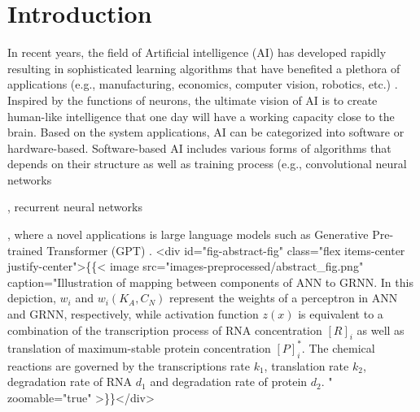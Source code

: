 \documentclass[twocolumn]{biophys-new}
\begin{document}
\section{Introduction}
In recent years, the field of Artificial intelligence (AI) has developed rapidly resulting in sophisticated learning algorithms that have benefited a plethora of applications (e.g., manufacturing, economics, computer vision, robotics, etc.) \cite{chowdhury2012advantages}.
Inspired by the functions of neurons, the ultimate vision of AI is to create human-like intelligence that one day will have a working capacity close to the brain. 
Based on the system applications, AI can be categorized into software or hardware-based. Software-based AI includes various forms of algorithms that depends on their structure as well as training process (e.g., convolutional neural networks {\cite{li2021survey}, recurrent neural networks {\cite{medsker2001recurrent}, where a novel applications is large language models such as Generative Pre-trained Transformer (GPT) \cite{kasneci2023chatgpt}. 
<div id="fig-abstract-fig" class="flex items-center justify-center">\{\{< image src="images-preprocessed/abstract_fig.png" caption="Illustration of mapping between components of ANN to GRNN. In this depiction, $w_i$ and $w_i(K_A, C_N)$ represent the weights of a perceptron in ANN and GRNN, respectively, while activation function $z(x)$ is equivalent to a combination of the transcription process of RNA concentration $[R]_i$ as well as translation of maximum-stable protein concentration $[P]_i^*$. The chemical reactions are governed by the transcriptions rate $k_1$, translation rate $k_2$, degradation rate of RNA $d_1$ and degradation rate of protein $d_2$. \vspace{1em}" zoomable="true" >\}\}</div>



}}
\end{document}
